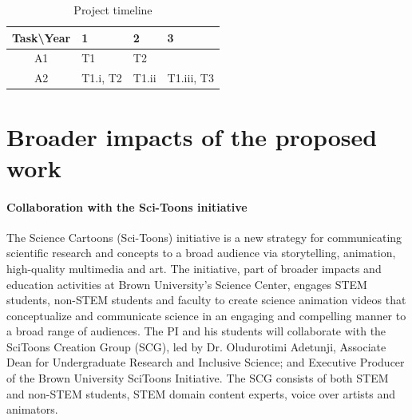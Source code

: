 \documentclass[10pt,letterpaper]{article}
\begin{document}
      \begin{table}[H]
        \center
        \caption{Project timeline}
        \label{t:timeline}
        \begin{tabular}{clll}
          \hline
          Task\textbackslash Year & 1 &  2 &  3 \\
          \hline
          A1 & T1 & T2 &  \\
          A2 & T1.i, T2 & T1.ii & T1.iii, T3 \\
          \hline
        \end{tabular}
      \end{table}

\section{Broader impacts of the proposed work}
  \label{s:broaderimp}
  \paragraph{Collaboration with the Sci-Toons initiative}
    The Science Cartoons (Sci-Toons) initiative is a new strategy for communicating scientific research and concepts to a broad audience via storytelling, animation, high-quality multimedia and art. The initiative, part of broader impacts and education activities at Brown University's Science Center, engages STEM students, non-STEM students and faculty to create science animation videos that conceptualize and communicate science in an engaging and compelling manner to a broad range of audiences. The PI and his students will collaborate with the SciToons Creation Group (SCG), led by Dr. Oludurotimi Adetunji, Associate Dean for Undergraduate Research and Inclusive Science; and Executive Producer of the Brown University SciToons Initiative. The SCG consists of both STEM and non-STEM students, STEM domain content experts, voice over artists and animators.
\end{document}
